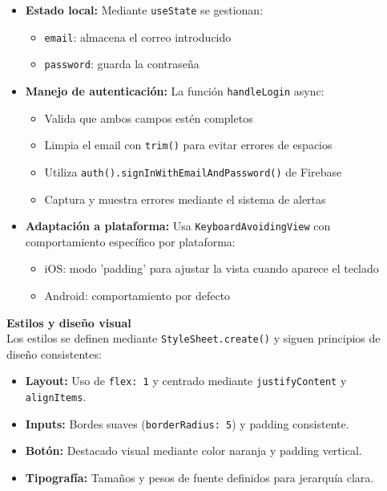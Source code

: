 \documentclass[twoside, openright, 11pt]{report}
\begin{document}
				\begin{itemize}
					\item \textbf{Estado local:} Mediante \texttt{useState} se gestionan:
					\begin{itemize}
						\item \texttt{email}: almacena el correo introducido
						\item \texttt{password}: guarda la contraseña
					\end{itemize}
					
					\item \textbf{Manejo de autenticación:} La función \texttt{handleLogin} async:
					\begin{itemize}
						\item Valida que ambos campos estén completos
						\item Limpia el email con \texttt{trim()} para evitar errores de espacios
						\item Utiliza \texttt{auth().signInWithEmailAndPassword()} de Firebase
						\item Captura y muestra errores mediante el sistema de alertas
					\end{itemize}
					
					\item \textbf{Adaptación a plataforma:} Usa \texttt{KeyboardAvoidingView} con comportamiento específico por plataforma:
					\begin{itemize}
						\item iOS: modo 'padding' para ajustar la vista cuando aparece el teclado
						\item Android: comportamiento por defecto
					\end{itemize}
				\end{itemize}
				
				
				\textbf{Estilos y diseño visual}\\
				Los estilos se definen mediante \texttt{StyleSheet.create()} y siguen principios de diseño consistentes:
				
				\begin{itemize}
					\item \textbf{Layout:} Uso de \texttt{flex: 1} y centrado mediante \texttt{justifyContent} y \texttt{alignItems}.
					\item \textbf{Inputs:} Bordes suaves (\texttt{borderRadius: 5}) y padding consistente.
					\item \textbf{Botón:} Destacado visual mediante color naranja y padding vertical.
					\item \textbf{Tipografía:} Tamaños y pesos de fuente definidos para jerarquía clara.
				\end{itemize}
			
\end{document}
